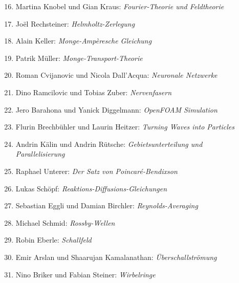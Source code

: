 \documentclass[handout]{beamer}
\begin{document}
\begin{frame}
\begin{columns}[t,onlytextwidth]
\begin{column}{0.60\textwidth}
\begin{description}
\begin{enumerate}
\setcounter{enumi}{15}
\item Martina Knobel und Gian Kraus: {\em Fourier-Theorie und Feldtheorie}
\item Joël Rechsteiner: {\em Helmholtz-Zerlegung}
\item Alain Keller: {\em Monge-Ampèresche Gleichung}
\item Patrik Müller: {\em Monge-Transport-Theorie}
\item Roman Cvijanovic und Nicola Dall'Acqua: {\em 
Neuronale Netzwerke}
\item Dino Ramcilovic und Tobias Zuber: {\em Nervenfasern}
\item Jero Barahona und Yanick Diggelmann: {\em OpenFOAM Simulation}
\item Flurin Brechbühler und Laurin Heitzer: {\em Turning Waves into Particles}
\item Andrin Kälin und Andrin Rütsche: {\em Gebietsunterteilung und
Parallelisierung}
\item Raphael Unterer: {\em Der Satz von Poincaré-Bendixson}
\item Lukas Schöpf: {\em Reaktions-Diffusions-Gleichungen}
\item Sebastian Eggli und Damian Birchler: {\em Reynolds-Averaging}
\item Michael Schmid: {\em Rossby-Wellen}
\item Robin Eberle: {\em Schallfeld}
\item Emir Arslan und Shaarujan Kamalanathan: {\em Überschallströmung}
\item Nino Briker und Fabian Steiner: {\em Wirbelringe}
\end{enumerate}
\end{description}
\end{column}
\begin{column}{0.01\textwidth}
\end{column}
\end{columns}
\end{frame}
\end{document}
